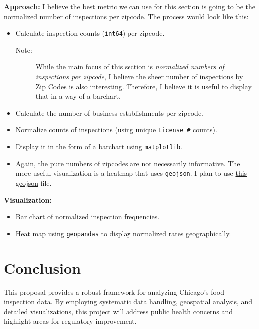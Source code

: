 \documentclass[12pt]{article}
\begin{document}
\textbf{Approach:}
I believe the best metric we can use for this section is going to be the normalized number of inspections per zipcode.
The process would look like this:
\begin{itemize}
    \item Calculate inspection counts (\texttt{int64}) per zipcode.
    \begin{description}
        \item[Note:] While the main focus of this section is \textit{normalized numbers of inspections per zipcode}, I believe the sheer number of inspections by Zip Codes is also interesting.
        Therefore, I believe it is useful to display that in a way of a barchart.
    \end{description}
    \item Calculate the number of business establishments per zipcode.
    \item Normalize counts of inspections (using unique \texttt{License \#} counts).
    \item Display it in the form of a barchart using \texttt{matplotlib}.
    \item Again, the pure numbers of zipcodes are not necessarily informative.
    The more useful visualization is a heatmap that uses \texttt{geojson}.
    I plan to use \href{https://github.com/smartchicago/chicago-atlas}{this geojson} file.
\end{itemize}

\textbf{Visualization:}
\begin{itemize}
    \item Bar chart of normalized inspection frequencies.
    \item Heat map using \texttt{geopandas} to display normalized rates geographically.
\end{itemize}

\section*{Conclusion}
\hspace*{2em}This proposal provides a robust framework for analyzing Chicago's food inspection data.
By employing systematic data handling, geospatial analysis, and detailed visualizations, this project will address public health concerns and highlight areas for regulatory improvement.
\end{document}

